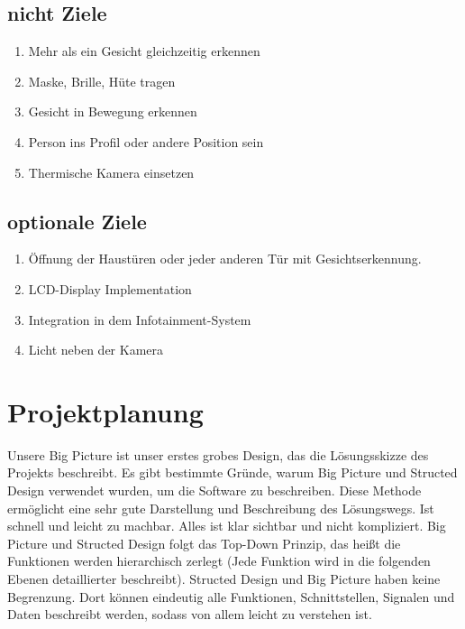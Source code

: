 \subsection{nicht Ziele}
\begin{enumerate}
	\item Mehr als ein Gesicht gleichzeitig erkennen
	
	\item Maske, Brille, Hüte tragen 
	
	\item Gesicht in Bewegung erkennen 
	
	\item Person ins Profil oder andere Position sein
	
	\item Thermische Kamera einsetzen
	
	
\end{enumerate}
\subsection{optionale Ziele}
\begin{enumerate}
	
	
	\item Öffnung der Haustüren oder jeder anderen Tür mit Gesichtserkennung.
	
	\item LCD-Display Implementation
	
	\item Integration in dem Infotainment-System
	
	\item Licht neben der Kamera 
\end{enumerate}
\section{Projektplanung}
Unsere Big Picture ist unser erstes grobes Design, das die Lösungsskizze des Projekts beschreibt. Es gibt bestimmte Gründe, warum Big Picture und Structed Design verwendet wurden, um die Software zu beschreiben. Diese Methode ermöglicht eine sehr gute Darstellung und Beschreibung des Lösungswegs. Ist schnell und leicht zu machbar. Alles ist klar sichtbar und nicht kompliziert. Big Picture und Structed Design folgt das Top-Down Prinzip, das heißt die Funktionen werden hierarchisch zerlegt (Jede Funktion wird in die folgenden Ebenen detaillierter beschreibt). Structed Design und Big Picture haben keine Begrenzung. Dort können eindeutig alle Funktionen, Schnittstellen, Signalen und Daten beschreibt werden, sodass von allem leicht zu verstehen ist. 


